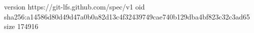 version https://git-lfs.github.com/spec/v1
oid sha256:a14586d80d49d47a0b0a82d13c4f32439749cae740b129dba4bf823c32c3ad65
size 174916
